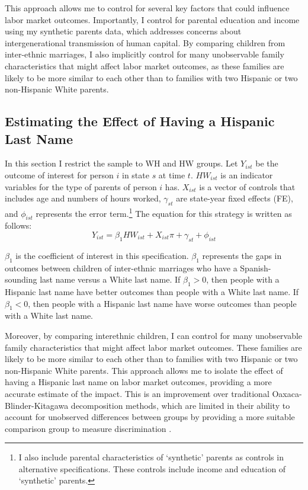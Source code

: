 This approach allows me to control for several key factors that could influence labor market outcomes. Importantly, I control for parental education and income using my synthetic parents data, which addresses concerns about intergenerational transmission of human capital. By comparing children from inter-ethnic marriages, I also implicitly control for many unobservable family characteristics that might affect labor market outcomes, as these families are likely to be more similar to each other than to families with two Hispanic or two non-Hispanic White parents.

\subsection{Estimating the Effect of Having a Hispanic Last Name}

In this section I restrict the sample to WH and HW groups. Let $Y_{ist}$ be the outcome of interest for person $i$ in state $s$ at time $t$. $HW_{ist}$ is an indicator variables for the type of parents of person $i$ has. $X_{ist}$ is a vector of controls that includes age and numbers of hours worked, $\gamma_{st}$ are state-year fixed effects (FE), and $\phi_{ist}$ represents the error term.\footnote{I also include parental characteristics of `synthetic' parents as controls in alternative specifications. These controls include income and education of `synthetic' parents.} The equation for this strategy is written as follows:
\begin{equation} \label{eq:1a}
Y_{ist} = \beta_{1} HW_{ist} + X_{ist} \pi + \gamma_{st} + \phi_{ist}
\end{equation}

$\beta_{1}$ is the coefficient of interest in this specification. $\beta_{1}$ represents the gaps in outcomes between children of inter-ethnic marriages who have a Spanish-sounding last name versus a White last name. If $\beta_{1} > 0$, then people with a Hispanic last name have better outcomes than people with a White last name. If $\beta_{1} < 0$, then people with a Hispanic last name have worse outcomes than people with a White last name.

Moreover, by comparing interethnic children, I can control for many unobservable family characteristics that might affect labor market outcomes. These families are likely to be more similar to each other than to families with two Hispanic or two non-Hispanic White parents. This approach allows me to isolate the effect of having a Hispanic last name on labor market outcomes, providing a more accurate estimate of the impact. This is an improvement over traditional Oaxaca-Blinder-Kitagawa decomposition methods, which are limited in their ability to account for unobserved differences between groups by providing a more suitable comparison group to measure discrimination \autocite{oaxaca1973male,blinder1973wage,kitagawa1955components}.

